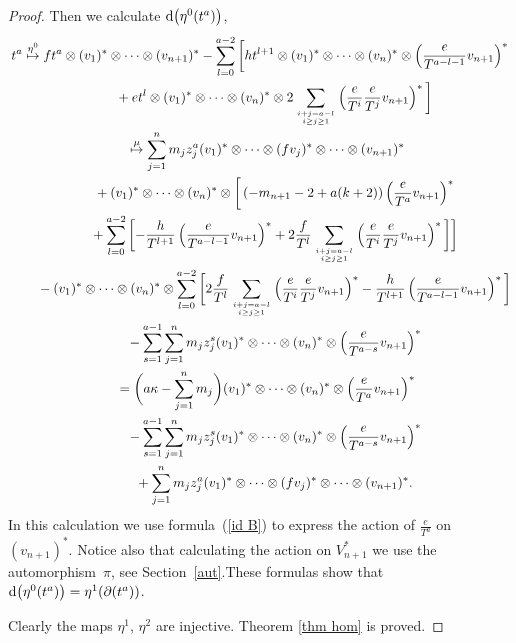 \begin{proof}
Then we calculate ${\rm d}\big(\eta^0(t^a)\big)$,
\begin{gather*}
t^a \overset{\eta^0}\mapsto ft^a\otimes (v_1)^*\otimes\dots\otimes (v_{n+1})^* - \sum_{l=0}^{a-2}\bigg[ht^{l+1}\otimes (v_1)^*\otimes\dots\otimes (v_n)^*\otimes \left(\frac{e}{T^{a-l-1}}v_{n+1}\right)^* \nonumber \\
\hphantom{t^a \overset{\eta^0}\mapsto}{} + et^l\otimes (v_1)^*\otimes\dots\otimes (v_n)^*\otimes 2\sum_{i+j=a-l\atop i\geq j\geq 1} \left(\frac{e}{T^i} \frac{e}{T^j}v_{n+1}\right)^* \bigg]
\nonumber \\
\hphantom{t^a}{}
\overset{\mu} \mapsto 	 \sum_{j=1}^n m_j z_j^a (v_1)^* \otimes \dots \otimes (f v_j)^* \otimes\dots\otimes (v_{n+1})^* \nonumber \\
\hphantom{t^a \overset{\eta^0}\mapsto}{} + (v_1)^* \otimes \dots \otimes (v_n)^* \otimes \bigg[\left(-m_{n+1}-2+a(k+2)\right) \left(\frac{e}{T^a}v_{n+1} \right)^* \nonumber \\
\hphantom{t^a \overset{\eta^0}\mapsto}{}+ \sum_{l=0}^{a-2} \bigg[{-} \frac{h}{T^{l+1}} \left(\frac{e}{T^{a-l-1}} v_{n+1} \right)^* + 2\frac{f}{T^l} \sum_{i+j=a-l\atop i\geq j\geq1} \left(\frac{e}{T^i} \frac{e}{T^j} v_{n+1} \right)^* \bigg] \bigg] \nonumber \\
\hphantom{t^a \overset{\eta^0}\mapsto}{}
-(v_1)^*\otimes\dots\otimes (v_n)^* \otimes \sum_{l=0}^{a-2} \bigg[ 2\frac{f}{T^l} \sum_{i+j=a-l\atop i\geq j\geq1} \left(\frac{e}{T^i} \frac{e}{T^j} v_{n+1} \right)^* - \frac{h}{T^{l+1}} \left(\frac{e}{T^{a-l-1}} v_{n+1} \right)^* \bigg] \nonumber \\
\hphantom{t^a \overset{\eta^0}\mapsto}{} - \sum_{s=1}^{a-1} \sum_{j=1}^n m_j z_j^s (v_1)^* \otimes \dots \otimes (v_n)^* \otimes \left(\frac{e}{T^{a-s}} v_{n+1}\right)^* \nonumber \\
\hphantom{t^a}{} = \bigg(a\kappa - \sum_{j=1}^n m_j\bigg) (v_1)^* \otimes \dots \otimes (v_n)^* \otimes \left(\frac{e}{T^a} v_{n+1}\right)^* \nonumber \\
\hphantom{t^a \overset{\eta^0}\mapsto}{} - \sum_{s=1}^{a-1} \sum_{j=1}^n m_j z_j^s (v_1)^* \otimes \dots \otimes (v_n)^* \otimes \left(\frac{e}{T^{a-s}} v_{n+1}\right)^* \nonumber \\
\hphantom{t^a \overset{\eta^0}\mapsto}{} + \sum_{j=1}^n m_j z_j^a (v_1)^* \otimes \dots \otimes (f v_j)^* \otimes\dots\otimes (v_{n+1})^*. \nonumber
\end{gather*}
In this calculation we use formula~(\ref{id B}) to express the action of $\frac{e}{T^a}$ on $(v_{n+1})^*$. Notice also that calculating the action on $V_{n+1}^*$ we use the automorphism~$\pi$, see Section~\ref{aut}.These formulas show that ${\rm d}\big(\eta^0(t^a)\big) = \eta^1(\partial(t^a))$.

Clearly the maps $\eta^1$, $\eta^2$ are injective. Theorem \ref{thm hom} is proved.
\end{proof}
